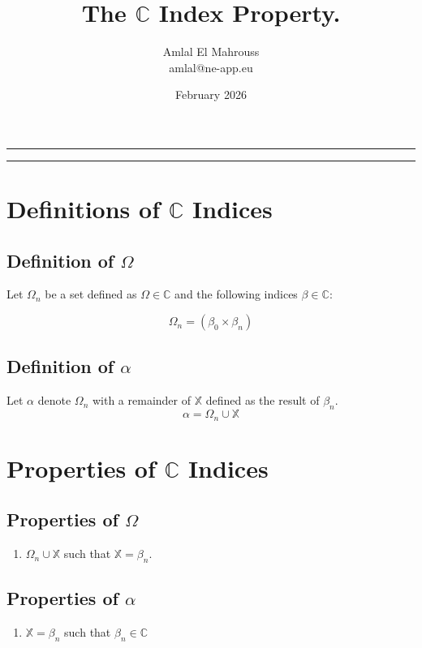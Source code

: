 \documentclass[11pt, a4paper]{article}
\title{The $\mathbb{C}$ Index Property.}
\author{Amlal El Mahrouss\\amlal@ne-app.eu}
\date{February 2026}
\begin{document}
\bf
\maketitle
\begin{center}
	\rule[0.01cm]{17cm}{0.01cm}
\end{center}
\begin{center}
	\rule[0.01cm]{17cm}{0.01cm}
\end{center}

\section{Definitions of $\mathbb{C}$ Indices}

\subsection{Definition of $\Omega$}

Let $\Omega_{n}$ be a set defined as $\Omega \in \mathbb{C}$ and the following indices $\beta \in \mathbb{C}$:

\begin{equation}
	\Omega_{n} = (\beta_{0} \times \beta_{n})
\end{equation}

\subsection{Definition of $\alpha$}

Let $\alpha$ denote $\Omega_{n}$ with a remainder of $\mathbb{X}$ defined as the result of $\beta_{n}$.
\begin{equation}
	\alpha = \Omega_{n} \cup \mathbb{X}
\end{equation}

\section{Properties of $\mathbb{C}$ Indices}

\subsection{Properties of $\Omega$}

\begin{enumerate}
	\item $\Omega_{n} \cup \mathbb{X}$ such that $\mathbb{X} = \beta_{n}$.
\end{enumerate}

\subsection{Properties of $\alpha$}

\begin{enumerate}

	\item $\mathbb{X} = \beta_{n}$ such that $\beta_{n} \in \mathbb{C}$
	
\end{enumerate}
\end{document}
